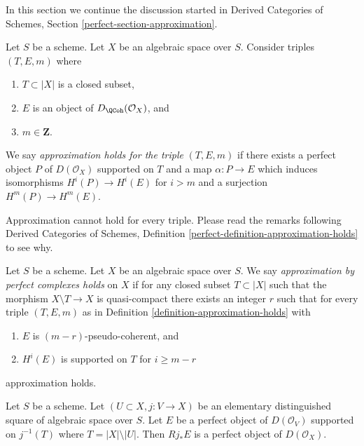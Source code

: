 \noindent
In this section we continue the discussion started in
Derived Categories of Schemes, Section \ref{perfect-section-approximation}.

\begin{definition}
\label{definition-approximation-holds}
Let $S$ be a scheme. Let $X$ be an algebraic space over $S$.
Consider triples $(T, E, m)$ where
\begin{enumerate}
\item $T \subset |X|$ is a closed subset,
\item $E$ is an object of $D_\QCoh(\mathcal{O}_X)$, and
\item $m \in \mathbf{Z}$.
\end{enumerate}
We say {\it approximation holds for the triple} $(T, E, m)$ if
there exists a perfect object $P$ of $D(\mathcal{O}_X)$ supported on $T$
and a map $\alpha : P \to E$ which induces isomorphisms $H^i(P) \to H^i(E)$
for $i > m$ and a surjection $H^m(P) \to H^m(E)$.
\end{definition}

\noindent
Approximation cannot hold for every triple. Please read the remarks following
Derived Categories of Schemes, Definition
\ref{perfect-definition-approximation-holds} to see why.

\begin{definition}
\label{definition-approximation}
Let $S$ be a scheme. Let $X$ be an algebraic space over $S$.
We say {\it approximation by perfect complexes holds}
on $X$ if for any closed subset $T \subset |X|$ such that
the morphism $X \setminus T \to X$ is quasi-compact
there exists an integer $r$ such that for every triple $(T, E, m)$ as in
Definition \ref{definition-approximation-holds} with
\begin{enumerate}
\item $E$ is $(m - r)$-pseudo-coherent, and
\item $H^i(E)$ is supported on $T$ for $i \geq m - r$
\end{enumerate}
approximation holds.
\end{definition}

\begin{lemma}
\label{lemma-pushforward-perfect}
Let $S$ be a scheme. Let $(U \subset X, j : V \to X)$ be an
elementary distinguished square of algebraic space over $S$.
Let $E$ be a perfect object of $D(\mathcal{O}_V)$ supported on
$j^{-1}(T)$ where $T = |X| \setminus |U|$. Then $Rj_*E$ is a
perfect object of $D(\mathcal{O}_X)$.
\end{lemma}

